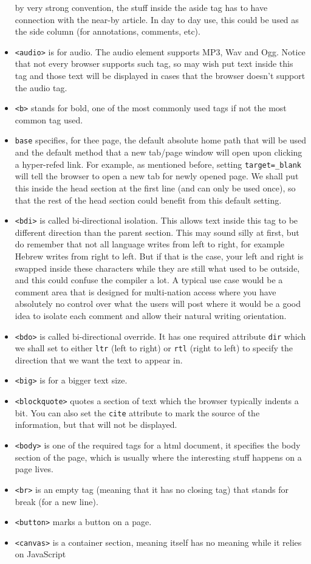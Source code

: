 \documentclass[oneside, 12pt]{article}
\newcommand{\itemm}[1]{\item \texttt{#1}}
\begin{document}
\begin{itemize}
	by very strong convention, the stuff inside the aside tag has to have connection with the near-by
	article. In day to day use, this could be used as the side column (for annotations, comments, etc).
	\itemm{<audio>} is for audio. The audio element supports MP3, Wav and Ogg. Notice that not every browser
	supports such tag, so may wish put text inside this tag and those text will be displayed in cases that
	the browser doesn't support the audio tag.
	\itemm{<b>} stands for bold, one of the most commonly used tags if not the most common tag used.
	\itemm{base} specifies, for thee page, the default absolute home path that will be used and the
	default method that a new tab/page window will open upon clicking a hyper-refed link. For example,
	as mentioned before, setting \texttt{target=\_blank} will tell the browser to open a new tab for
	newly opened page. We shall put this inside the head section at the first line (and can only be
	used once), so that the rest of the head section could benefit from this default setting.
	\itemm{<bdi>} is called bi-directional isolation. This allows text inside this tag to be different
	direction than the parent section. This may sound silly at first, but do remember that not all language
	writes from left to right, for example Hebrew writes from right to left. But if that is the case,
	your left and right is swapped inside these characters while they are still what used to be outside, and
	this could confuse the compiler a lot. A typical use case would be a comment area that is designed
	for multi-nation access where you have absolutely no control over what the users will post where it
	would be a good idea to isolate each comment and allow their natural writing orientation. 
	\itemm{<bdo>} is called bi-directional override. It has one required attribute \texttt{dir} which
	we shall set to either \texttt{ltr} (left to right) or \texttt{rtl} (right to left) to specify the
	direction that we want the text to appear in. 
	\itemm{<big>} is for a bigger text size.
	\itemm{<blockquote>} quotes a section of text which the browser typically indents a bit. You can
	also set the \texttt{cite} attribute to mark the source of the information, but that will not be
	displayed. 
	\itemm{<body>} is one of the required tags for a html document, it specifies the body section of
	the page, which is usually where the interesting stuff happens on a page lives.
	\itemm{<br>} is an empty tag (meaning that it has no closing tag) that stands for break (for a new line).
	\itemm{<button>} marks a button on a page.
	\itemm{<canvas>} is a container section, meaning itself has no meaning while it relies on JavaScript

\end{itemize}
\end{document}
